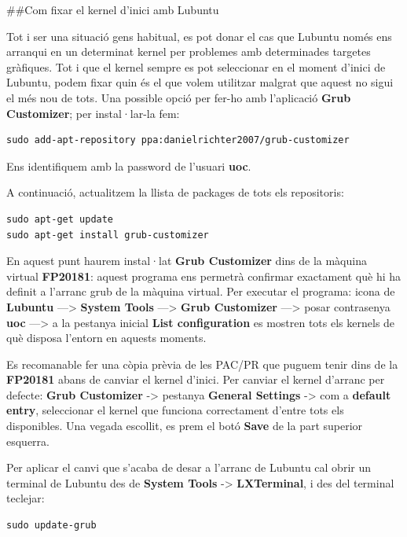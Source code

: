 \documentclass[]{book}
\begin{document}
\#\#Com fixar el kernel d'inici amb Lubuntu

Tot i ser una situació gens habitual, es pot donar el cas que Lubuntu només ens arranqui en un determinat kernel per problemes amb determinades targetes gràfiques. Tot i que el kernel sempre es pot seleccionar en el moment d'inici de Lubuntu, podem fixar quin és el que volem utilitzar malgrat que aquest no sigui el més nou de tots. Una possible opció per fer-ho amb l'aplicació \textbf{Grub Customizer}; per instal·lar-la fem:

\begin{verbatim}
sudo add-apt-repository ppa:danielrichter2007/grub-customizer
\end{verbatim}

Ens identifiquem amb la password de l'usuari \textbf{uoc}.

A continuació, actualitzem la llista de packages de tots els repositoris:

\begin{verbatim}
sudo apt-get update
sudo apt-get install grub-customizer
\end{verbatim}

En aquest punt haurem instal·lat \textbf{Grub Customizer} dins de la màquina virtual \textbf{FP20181}: aquest programa ens permetrà confirmar exactament què hi ha definit a l'arranc grub de la màquina virtual. Per executar el programa: icona de \textbf{Lubuntu} ---\textgreater{} \textbf{System Tools} ---\textgreater{} \textbf{Grub Customizer} ---\textgreater{} posar contrasenya \textbf{uoc} ---\textgreater{} a la pestanya inicial \textbf{List configuration} es mostren tots els kernels de què disposa l'entorn en aquests moments.

Es recomanable fer una còpia prèvia de les PAC/PR que puguem tenir dins de la \textbf{FP20181} abans de canviar el kernel d'inici. Per canviar el kernel d'arranc per defecte: \textbf{Grub Customizer} -\textgreater{} pestanya \textbf{General Settings} -\textgreater{} com a \textbf{default entry}, seleccionar el kernel que funciona correctament d'entre tots els disponibles. Una vegada escollit, es prem el botó \textbf{Save} de la part superior esquerra.

Per aplicar el canvi que s'acaba de desar a l'arranc de Lubuntu cal obrir un terminal de Lubuntu des de \textbf{System Tools} -\textgreater{} \textbf{LXTerminal}, i des del terminal teclejar:

\begin{verbatim}
sudo update-grub
\end{verbatim}
\end{document}
